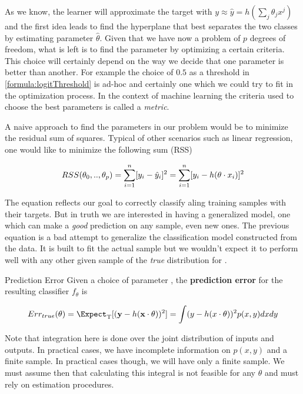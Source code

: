 
As we know, the learner will approximate the target with $y \approx \hat{y} = h\left(\sum_{j}\theta_j x^j\right)$ and the first idea leads to find the hyperplane that best separates the two classes by estimating parameter $\hat{\theta}$. Given that we have now a problem of $p$ degrees of freedom, what is left is to find the parameter by optimizing a certain criteria. This choice will certainly depend on the way we decide that one parameter is better than another. For example the choice of $0.5$ as a threshold in \ref{formula:logitThreshold} is ad-hoc and certainly one which we could try to fit in the optimization process. In the context of machine learning the criteria used to choose the best parameters is called a \textit{metric}.

A naive approach to find the parameters in our problem would be to minimize the residual sum of squares. Typical of other scenarios such as linear regression, one would like to minimize the following sum (RSS)  

\begin{equation} \label{eq:rss}
RSS(\theta_0,..,\theta_p)  = \sum_{i=1}^n [y_i - \hat{y}_i]^2  \\
=  \sum_{i=1}^n [y_i - h( \theta \cdot x_i)]^2
\end{equation}

The equation reflects our goal to correctly classify aling training samples with their targets. But in truth we are interested in having a generalized model, one which can make a \textit{good} prediction on any sample, even new ones. The previous equation is a bad attempt to generalize the classification model constructed from the data. It is built to fit the actual sample but we wouldn't expect it to perform well with any other given sample of the \textit{true} distribution for . 

\begin{definition}{Prediction Error}
Given a choice of parameter \theta, the \textbf{prediction error} for the resulting classifier $f_\theta$ is

\[
    Err_{true}(\theta)  = \Expect_{ \mathrm{T}}[(\textbf{y} - h(\textbf{x} \cdot \theta) )^2] \\
    = \int (y - h(x \cdot \theta) )^2 p(x,y)dxdy
\]
\end{definition}

Note that integration here is done over the joint distribution of inputs and outputs. In practical cases, we have incomplete information on $p(x,y)$ and a finite sample.
In practical cases though, we will have only a finite sample. We must assume then that calculating this integral is not feasible for any $\theta$ and must rely on estimation procedures.

